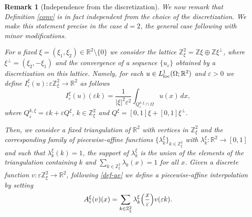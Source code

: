 \documentclass[11pt]{article}
\newtheorem{remark}[definition]{Remark}
\def\e{\varepsilon}
\begin{document}
\begin{remark}[Independence from the discretization]\label{indepp}\rm 
We now remark that Definition \ref{conv} is in fact independent from the choice of the discretization. 
We make this statement precise in the case $d=2$, the general case following with minor modifications. 

For a fixed $\xi=(\xi_1,\xi_2)\in\mathbb R^2\setminus\{0\}$
we consider the lattice $\mathbb Z_\xi^2=\mathbb Z \xi \oplus \mathbb Z \xi^\perp$, 
where $\xi^\perp=(\xi_2,-\xi_1)$ and the convergence of a sequence $\{u_\e\}$ obtained by a discretization on this lattice.   
Namely, for each $u\in L^1_{\rm loc}(\Omega; \mathbb R^2)$ and $\e>0$ we define $I^\xi_\e(u)\colon\e\mathbb Z^2_\xi \to\mathbb R^2$ as follows
\begin{equation}
I_\e^\xi(u)(\e k)=
\frac{1}{|\xi|^2\e^2}\int_{Q_\e^{k,\xi}\cap \Omega}u(x)\, dx,
\end{equation}
where $Q_\e^{k,\xi}=\e k+ \e Q^\xi$, $k\in \mathbb Z^2_\xi$ and $Q^\xi=[0,1]\xi+[0,1]\xi^\perp$.    

Then, we consider a fixed triangulation of $\mathbb R^2$ with vertices in $\mathbb Z^2_\xi$ and the corresponding family of piecewise-affine functions $\{\lambda_k^\xi\}_{k\in\mathbb Z^2_\xi}$ with $\lambda_k^\xi\colon\mathbb R^2\to[0,1]$ and such that $\lambda_k^\xi(k)=1$, the support of $\lambda_k^\xi$ is the union of the elements of the triangulation containing $k$ and $\sum_{k\in\mathbb Z^2_\xi}\lambda_k(x)=1$ for all $x$. 
Given a discrete function $v\colon\e \mathbb Z^2_\xi\to\mathbb R^2$, following \eqref{def-ae} we define a piecewise-affine interpolation by setting
\begin{equation}
A_\e^\xi(v)(x)=\sum_{k\in\mathbb Z^2_\xi}\lambda_k^\xi\Big({x\over\e}\Big) v(\e k). 
\end{equation}


\end{remark}
\end{document}
